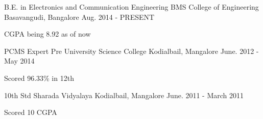 \begin{cventries}
  \cventry
    {B.E. in Electronics and Communication Engineering}
    {BMS College of Engineering}
    {Basavangudi, Bangalore}
    {Aug. 2014 - PRESENT}
    {
      \begin{cvitems}
        \item {CGPA being 8.92 as of now}
      \end{cvitems}
    }
    \cventry
    {PCMS}
    {Expert Pre University Science College}
    {Kodialbail, Mangalore}
    {June. 2012 - May 2014}
    {
      \begin{cvitems}
        \item {Scored 96.33\% in 12th}
      \end{cvitems}
    }
    \cventry
    {10th Std}
    {Sharada Vidyalaya}
    {Kodialbail, Mangalore}
    {June. 2011 - March 2011}
    {
      \begin{cvitems}
        \item {Scored 10 CGPA}
      \end{cvitems}
    }
\end{cventries}
